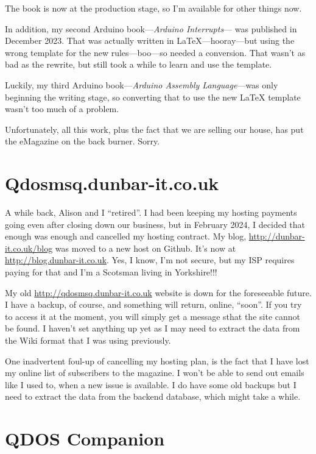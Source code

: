 The book is now at the production stage, so I'm available for other things now.

In addition, my second Arduino book---\emph{Arduino Interrupts}--- was published in December 2023. That was actually written in \LaTeX{}---hooray---but using the wrong template for the new rules---boo---so needed a conversion. That wasn't as bad as the rewrite, but still took a while to learn and use the template.

Luckily, my third Arduino book---\emph{Arduino Assembly Language}---was only beginning the writing stage, so converting that to use the new \LaTeX{} template wasn't too much of a problem.

Unfortunately, all this work, plus the fact that we are selling our house, has put the eMagazine on the back burner. Sorry.


\section{Qdosmsq.dunbar-it.co.uk}

A while back, Alison and I ``retired''. I had been keeping my hosting payments going even after closing down our business, but in February 2024, I decided that enough was enough and cancelled my hosting contract. My blog, \url{http://dunbar-it.co.uk/blog} was moved to a new host on Github. It's now at \url{http://blog.dunbar-it.co.uk}. Yes, I know, I'm not secure, but my ISP requires paying for that and I'm a Scotsman living in Yorkshire!!!

My old \url{http://qdosmsq.dunbar-it.co.uk} website is down for the foreseeable future. I have a backup, of course, and something will return, online, ``soon''. If you try to access it at the moment, you will simply get a message sthat the site cannot be found. I haven't set anything up yet as I may need to extract the data from the Wiki format that I was using previously.

One inadvertent foul-up of cancelling my hosting plan, is the fact that I have lost my online list of subscribers to the magazine. I won't be able to send out emails like I used to, when a new issue is available. I do have some old backups but I need to extract the data from the backend database, which might take a while.

\section{QDOS Companion}

